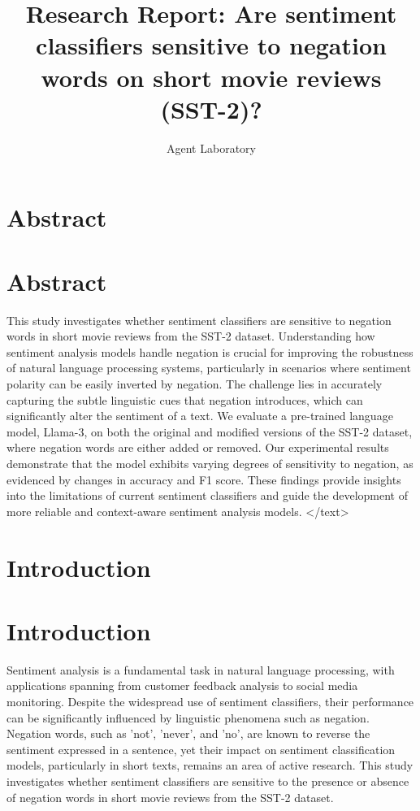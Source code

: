 \documentclass{article}
\title{Research Report: Are sentiment classifiers sensitive to negation words on short movie reviews (SST-2)?}
\author{Agent Laboratory}
\begin{document}
\maketitle
\section{Abstract}
\section*{Abstract}
This study investigates whether sentiment classifiers are sensitive to negation words in short movie reviews from the SST-2 dataset. Understanding how sentiment analysis models handle negation is crucial for improving the robustness of natural language processing systems, particularly in scenarios where sentiment polarity can be easily inverted by negation. The challenge lies in accurately capturing the subtle linguistic cues that negation introduces, which can significantly alter the sentiment of a text. We evaluate a pre-trained language model, Llama-3, on both the original and modified versions of the SST-2 dataset, where negation words are either added or removed. Our experimental results demonstrate that the model exhibits varying degrees of sensitivity to negation, as evidenced by changes in accuracy and F1 score. These findings provide insights into the limitations of current sentiment classifiers and guide the development of more reliable and context-aware sentiment analysis models.
</text>
\section{Introduction}
\section*{Introduction}

Sentiment analysis is a fundamental task in natural language processing, with applications spanning from customer feedback analysis to social media monitoring. Despite the widespread use of sentiment classifiers, their performance can be significantly influenced by linguistic phenomena such as negation. Negation words, such as 'not', 'never', and 'no', are known to reverse the sentiment expressed in a sentence, yet their impact on sentiment classification models, particularly in short texts, remains an area of active research. This study investigates whether sentiment classifiers are sensitive to the presence or absence of negation words in short movie reviews from the SST-2 dataset. 
\end{document}
